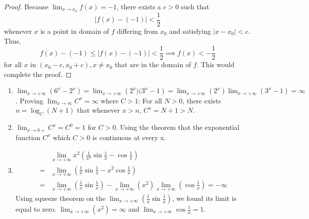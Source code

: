 \begin{numedquestion}

\begin{proof} 
Because $\lim_{x \rightarrow x_0}f(x) = -1$, there exists a \(c>0\) such that
\[
|f(x)-(-1)|< \frac{1}{2}
\]
whenever \(x\) is a point in domain of $f$ differing from \(x_{0}\) and satisfying \(\left|x-x_{0}\right|<c .\) Thus,
\[
f(x) - (-1) \leq |f(x)- (-1)| < \frac{1}{2} \implies f(x) < -\frac{1}{2}
\]
for all \(x\) in \(\left(x_{0}-c, x_{0}+c\right), x \neq x_0\) that are in the domain of \(f .\) This would complete the proof.
\end{proof}

\end{numedquestion}


\begin{numedquestion}
  
\begin{enumerate}[label = {(\arabic*)}]
    \item \(\lim_{x \rightarrow+\infty}\left(6^{x}-2^{x}\right) = \lim_{x \rightarrow+\infty}\left(2^{x})(3^x-1\right) = \lim_{x \rightarrow+\infty}(2^{x})\lim_{x \rightarrow+\infty}(3^x-1) = \infty\). 
    Proving $\lim_{x \rightarrow \infty} C^x = \infty$ where $C > 1$: For all $N >0$, there exists $n = \log_C (N+1)$ that whenever $x > n$, $C^x = N + 1 > N$.       
    
    \item \(\lim _{x \rightarrow 0+} C^{x} = C^0 = 1\) for \(C>0\). Using the theorem that the exponential function $C^x$ which $C>0$ is continuous at every x.
    
    \item 
    \begin{align*}
      &\lim _{x \rightarrow+\infty} x^2(\frac{1}{x^3} \sin \frac{1}{x}-\cos \frac{1}{x}) \\
      = &\lim _{x \rightarrow+\infty} (\frac{1}{x} \sin \frac{1}{x}-x^2\cos \frac{1}{x}) \\
      = &\lim _{x \rightarrow+\infty} (\frac{1}{x} \sin \frac{1}{x})- \lim _{x \rightarrow+\infty}(x^2) \lim _{x \rightarrow+\infty}(\cos \frac{1}{x}) = -\infty  
    \end{align*} 
    Using squeeze theorem on the $\lim _{x \rightarrow+\infty} (\frac{1}{x} \sin \frac{1}{x})$, we found its limit is equal to zero. $\lim _{x \rightarrow+\infty}(x^2) = \infty$ and $\lim _{x \rightarrow+\infty}\cos \frac{1}{x} = 1$.
\end{enumerate}
\end{numedquestion}



